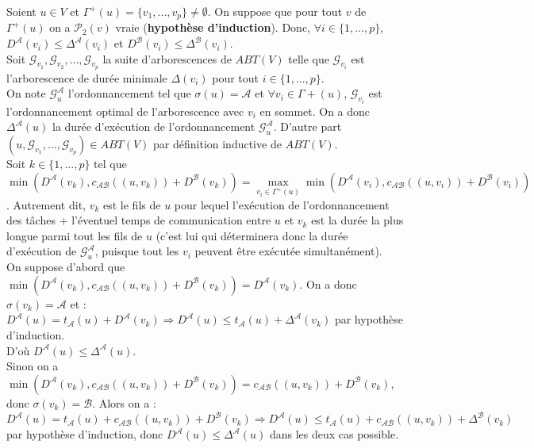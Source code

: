 \documentclass{article}
\begin{document}
Soient $u \in V$ et $\Gamma^{+}(u) = \{v_{1},...,v_{p} \} \neq \emptyset$. On suppose que pour tout $v$ de $\Gamma^{+}(u)$ on a $\mathcal{P}_2(v)$ vraie (\textbf{hypothèse d'induction}). Donc, $\forall i \in \{1,...,p\}$, $D^{\mathcal{A}}(v_i) \leq \Delta^{\mathcal{A}}(v_i)$ et $D^{\mathcal{B}}(v_i) \leq \Delta^{\mathcal{B}}(v_i)$. \\
Soit $\mathcal{G}_{v_{1}},\mathcal{G}_{v_{2}},...,\mathcal{G}_{{v_p}}$ la suite d'arborescences de $ABT(V)$ telle que $\mathcal{G}_{v_i}$ est l'arborescence de durée minimale $\Delta(v_i)$ pour tout $i \in \{1,...,p\}$.\\
On note $\mathcal{G}^{\mathcal{A}}_u$ l'ordonnancement tel que $\sigma(u)=\mathcal{A}$ et $\forall v_i \in \Gamma{+}(u)$, $\mathcal{G}_{v_{i}}$ est l'ordonnancement optimal de l'arborescence avec $v_i$ en sommet. On a donc $\Delta^{\mathcal{A}}(u)$ la durée d'exécution de l'ordonnancement $\mathcal{G}^{\mathcal{A}}_u$. D'autre part $(u,\mathcal{G}_{v_{1}},...,\mathcal{G}_{{v_p}}) \in ABT(V)$ par définition inductive de $ABT(V)$. \\
Soit $k \in \{1,...,p\}$ tel que $\min(D^{\mathcal{A}}(v_k),c_{\mathcal{A}\mathcal{B}}((u,v_k)) +D^{\mathcal{B}}(v_k)) = \max\limits_{v_{i} \in \Gamma^{+}(u)} \min(D^{\mathcal{A}}(v_i),c_{\mathcal{A}\mathcal{B}}((u,v_i)) + D^{\mathcal{B}}(v_i))$. Autrement dit, $v_k$ est le fils de $u$ pour lequel l'exécution de l'ordonnancement des tâches + l'éventuel temps de communication entre $u$ et $v_k$ est la durée la plus longue parmi tout les fils de $u$ (c'est lui qui déterminera donc la durée d'exécution de $\mathcal{G}^{\mathcal{A}}_u$, puisque tout les $v_i$ peuvent être exécutée simultanément).\\
On suppose d'abord que $\min(D^{\mathcal{A}}(v_k),c_{\mathcal{A}\mathcal{B}}((u,v_k)) +D^{\mathcal{B}}(v_k)) = D^{\mathcal{A}}(v_k)$. On a donc $\sigma(v_k) = \mathcal{A}$ et : \\
$D^{\mathcal{A}}(u) = t_{\mathcal{A}}(u) + D^{\mathcal{A}}(v_k) \Rightarrow D^{\mathcal{A}}(u) \leq t_{\mathcal{A}}(u) + \Delta^{\mathcal{A}}(v_k)$ par hypothèse d'induction. \\
D'où $D^{\mathcal{A}}(u) \leq \Delta^{\mathcal{A}}(u)$. \\

Sinon on a $\min(D^{\mathcal{A}}(v_k),c_{\mathcal{A}\mathcal{B}}((u,v_k)) +D^{\mathcal{B}}(v_k)) = c_{\mathcal{A}\mathcal{B}}((u,v_k)) + D^{\mathcal{B}}(v_k)$, donc $\sigma(v_k) = \mathcal{B}$. Alors on a : \\
$D^{\mathcal{A}}(u) = t_{\mathcal{A}}(u) + c_{\mathcal{A}\mathcal{B}}((u,v_k)) + D^{\mathcal{B}}(v_k) \Rightarrow D^{\mathcal{A}}(u) \leq t_{\mathcal{A}}(u) + c_{\mathcal{A}\mathcal{B}}((u,v_k)) + \Delta^{\mathcal{B}}(v_k)$ par hypothèse d'induction, donc $D^{\mathcal{A}}(u) \leq \Delta^{\mathcal{A}}(u)$ dans les deux cas possible.
\end{document}

